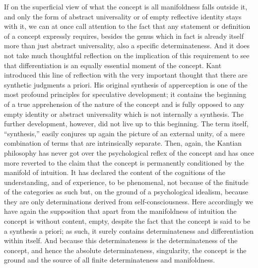 If on the superficial view of what the concept is
all manifoldness falls outside it,
and only the form of abstract universality
or of empty reflective identity stays with it,
we can at once call attention to the fact that
any statement or definition of a concept expressly requires,
besides the genus which in fact is already itself
more than just abstract universality,
also a specific determinateness.
And it does not take much thoughtful reflection
on the implication of this requirement to see
that differentiation is an equally
essential moment of the concept.
Kant introduced this line of reflection
with the very important thought
that there are synthetic judgments a priori.
His original synthesis of apperception is
one of the most profound principles
for speculative development;
it contains the beginning of a
true apprehension of the nature of the concept
and is fully opposed to any
empty identity or abstract universality
which is not internally a synthesis.
The further development, however,
did not live up to this beginning.
The term itself, “synthesis,” easily conjures up
again the picture of an external unity,
of a mere combination of terms that are intrinsically separate.
Then, again, the Kantian philosophy has never got over
the psychological reflex of the concept
and has once more reverted to the claim
that the concept is permanently conditioned
by the manifold of intuition.
It has declared the content of the cognitions
of the understanding, and of experience, to be phenomenal,
not because of the finitude of the categories as such
but, on the ground of a psychological idealism,
because they are only determinations derived from self-consciousness.
Here accordingly we have again the supposition
that apart from the manifoldness of intuition
the concept is without content, empty,
despite the fact that the concept is
said to be a synthesis a priori;
as such, it surely contains determinateness
and differentiation within itself.
And because this determinateness is
the determinateness of the concept,
and hence the absolute determinateness, singularity,
the concept is the ground and the source
of all finite determinateness and manifoldness.

